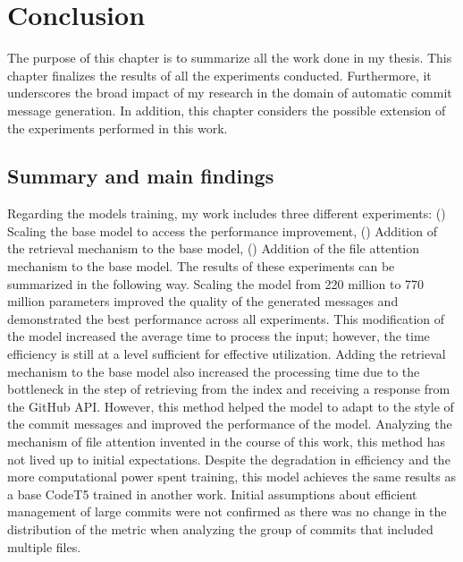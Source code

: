 \chapter{Conclusion}\label{chap:conclusion}
The purpose of this chapter is to summarize all the work done in my thesis. This chapter finalizes the results of all the experiments conducted. Furthermore, it underscores the broad impact of my research in the domain of automatic commit message generation. 
In addition, this chapter considers the possible extension of the experiments performed in this work. 

\section{Summary and main findings}
Regarding the models training, my work includes three different experiments: () Scaling the base model to access the performance improvement, () Addition of the retrieval mechanism to the base model, () Addition of the file attention mechanism to the base model. The results of these experiments can be summarized in the following way. 
Scaling the model from 220 million to 770 million parameters improved the quality of the generated messages and demonstrated the best performance across all experiments. This modification of the model increased the average time to process the input; however, the time efficiency is still at a level sufficient for effective utilization. 
Adding the retrieval mechanism to the base model also increased the processing time due to the bottleneck in the step of retrieving from the index and receiving a response from the GitHub API. However, this method helped the model to adapt to the style of the commit messages and improved the performance of the model. 
Analyzing the mechanism of file attention invented in the course of this work, this method has not lived up to initial expectations. Despite the degradation in efficiency and the more computational power spent training, this model achieves the same results as a base CodeT5 trained in another work. Initial assumptions about efficient management of large commits were not confirmed as there was no change in the distribution of the metric when analyzing the group of commits that included multiple files. 

